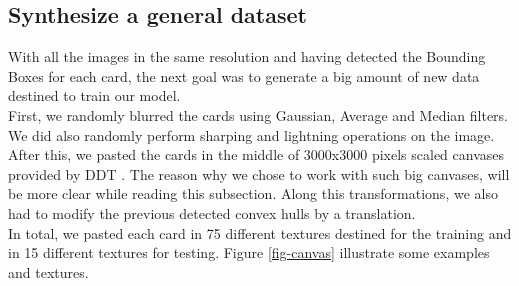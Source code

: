 \documentclass[a4paper]{article}
\begin{document}
\subsection*{Synthesize a general dataset}
With all the images in the same resolution and having detected the Bounding Boxes for each card, the next goal was to generate a big amount of new data destined to train our model. \\
First, we randomly blurred the cards using Gaussian, Average and Median filters.  We did also randomly perform sharping and lightning operations on the image.  After this, we pasted the cards in the middle of 3000x3000 pixels scaled canvases provided by DDT \cite{cimpoi14describing}.  The reason why we chose to work with such big canvases, will be more clear while reading this subsection.  Along this transformations, we also had to modify the previous detected convex hulls by a translation.\\
In total, we pasted each card in 75 different textures destined for the training and in 15 different textures for testing.  Figure \ref{fig-canvas} illustrate some examples and textures. \\ \\
\end{document}
